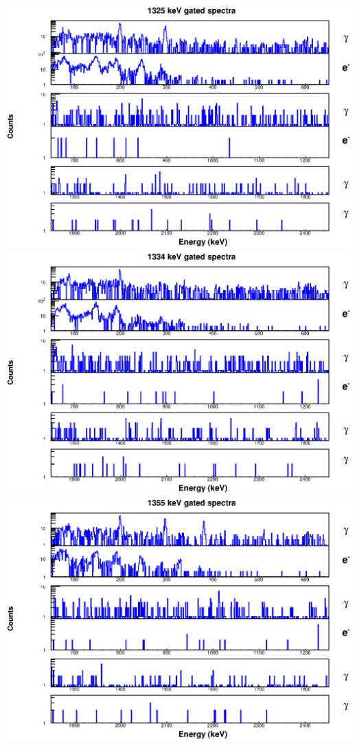 \begin{landscape}
\includegraphics[scale=1.1]{156Gd_Appendix/1325_combined.eps}
\includegraphics[scale=1.1]{156Gd_Appendix/1334_combined.eps}
\includegraphics[scale=1.1]{156Gd_Appendix/1355_combined.eps}

\end{landscape}

